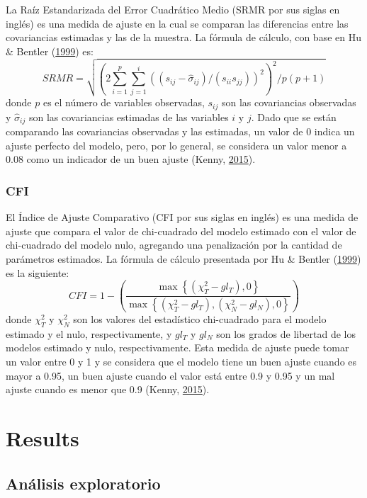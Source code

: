 \documentclass[
  english]{revcoles}
\begin{document}
La Raíz Estandarizada del Error Cuadrático Medio (SRMR por sus siglas en
inglés) es una medida de ajuste en la cual se comparan las diferencias
entre las covariancias estimadas y las de la muestra. La fórmula de
cálculo, con base en Hu \& Bentler
(\protect\hyperlink{ref-Hu1999}{1999}) es: \[
  SRMR = \sqrt{\left(2 \sum\limits_{i=1}^p \sum\limits_{j=1}^i \left((s_{ij} - \hat\sigma_{ij}) / (s_{ii} s_{jj}) \right)^2 \right)^2 / p(p+1)}
\] donde \(p\) es el número de variables observadas, \(s_{ij}\) son las
covariancias observadas y \(\hat\sigma_{ij}\) son las covariancias
estimadas de las variables \(i\) y \(j\). Dado que se están comparando
las covariancias observadas y las estimadas, un valor de 0 indica un
ajuste perfecto del modelo, pero, por lo general, se considera un valor
menor a 0.08 como un indicador de un buen ajuste (Kenny,
\protect\hyperlink{ref-Kenny2015}{2015}).

\subsubsection{CFI}

El Índice de Ajuste Comparativo (CFI por sus siglas en inglés) es una
medida de ajuste que compara el valor de chi-cuadrado del modelo
estimado con el valor de chi-cuadrado del modelo nulo, agregando una
penalización por la cantidad de parámetros estimados. La fórmula de
cálculo presentada por Hu \& Bentler
(\protect\hyperlink{ref-Hu1999}{1999}) es la siguiente: \[
  CFI = 1 - \left( \frac{\max \left\{(\chi^2_T - gl_T), 0  \right\}}{\max \left\{(\chi^2_T - gl_T), (\chi^2_N - gl_N), 0 \right\}} \right)
\] donde \(\chi^2_T\) y \(\chi^2_N\) son los valores del estadístico
chi-cuadrado para el modelo estimado y el nulo, respectivamente, y
\(gl_T\) y \(gl_N\) son los grados de libertad de los modelos estimado y
nulo, respectivamente. Esta medida de ajuste puede tomar un valor entre
0 y 1 y se considera que el modelo tiene un buen ajuste cuando es mayor
a 0.95, un buen ajuste cuando el valor está entre 0.9 y 0.95 y un mal
ajuste cuando es menor que 0.9 (Kenny,
\protect\hyperlink{ref-Kenny2015}{2015}).

\section{Results}

\subsection{Análisis exploratorio}
\end{document}
